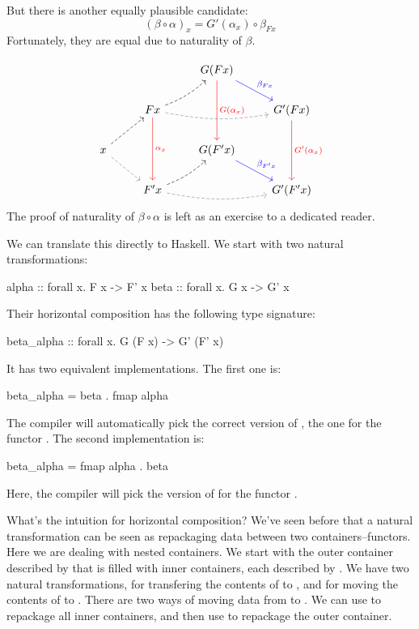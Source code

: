 \documentclass[DaoFP]{subfiles}
\begin{document}
But there is another equally plausible candidate: 
\[ (\beta \circ \alpha)_x = G'(\alpha_x) \circ \beta_{F x}\]
Fortunately, they are equal due to naturality of $\beta$. 

\[
 \begin{tikzcd}
  && G(F x)
  \arrow[dd, red, "G(\alpha_x)"]
  \arrow[dr, blue, "\beta_{F x}"]
  \\
  & F x
  \arrow[rr, bend right=10, dashed, gray]
  \arrow[ur, bend right=10, dashed]
  \arrow[dd, red, "\alpha_x"]
 && G' (F x)
  \arrow[dd, red, "G'(\alpha_x)"]
 \\
 x
 \arrow[ur, dashed]
 \arrow[dr, gray, dashed]
 && G(F' x)
  \arrow[dr, blue, "\beta_{F' x}"]
 \\
 &F' x
  \arrow[rr, bend right=10, dashed, gray]
 \arrow[ur, bend right=10, dashed]
 && G'(F' x)
\end{tikzcd}
\]
The proof of naturality of $\beta \circ \alpha$ is left as an exercise to a dedicated reader.

We can translate this directly to Haskell. We start with two natural transformations:
\begin{haskell}
alpha :: forall x. F x -> F' x
beta  :: forall x. G x -> G' x
\end{haskell}
Their horizontal composition has the following type signature:
\begin{haskell}
beta_alpha :: forall x. G (F x) -> G' (F' x)
\end{haskell}
It has two equivalent implementations. The first one is:
\begin{haskell}
beta_alpha = beta . fmap alpha
\end{haskell}
The compiler will automatically pick the correct version of , the one for the functor . The second implementation is:
\begin{haskell}
beta_alpha = fmap alpha . beta
\end{haskell}
Here, the compiler will pick the version of  for the functor .

What's the intuition for horizontal composition? We've seen before that a natural transformation can be seen as repackaging data between two containers--functors. Here we are dealing with nested containers. We start with the outer container described by  that is filled with inner containers, each described by . We have two natural transformations,  for transfering the contents of  to , and  for moving the contents of  to . There are two ways of moving data from  to . We can use  to repackage all inner containers, and then use  to repackage the outer container. 
\end{document}

